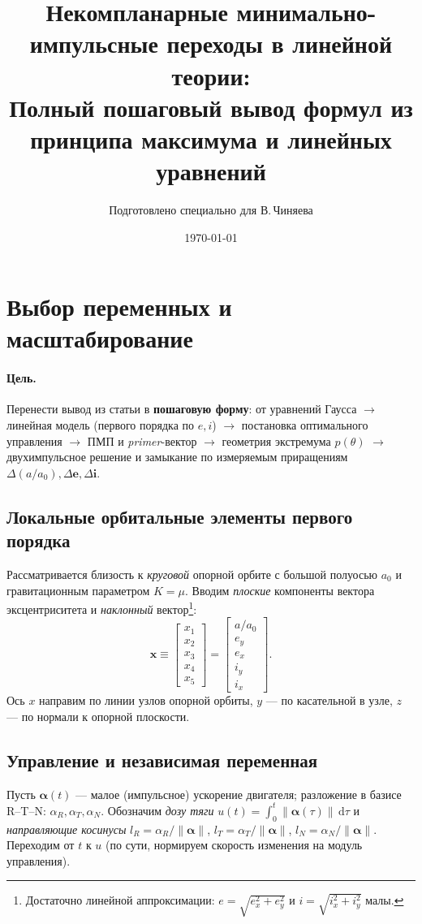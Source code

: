 \documentclass[12pt,a4paper]{article}
\title{Некомпланарные минимально-импульсные переходы в линейной теории:\\
\large Полный пошаговый вывод формул из принципа максимума и линейных уравнений}
\author{Подготовлено специально для В.\,Чиняева}
\date{\today}
\newcommand{\dd}{\,\mathrm{d}}
\newcommand{\vv}[1]{\bm{#1}}
\begin{document}
\maketitle
\tableofcontents

\section{Выбор переменных и масштабирование}

\paragraph{Цель.}
Перенести вывод из статьи в \textbf{пошаговую форму}: от уравнений Гаусса $\to$ линейная модель (первого порядка по $e,i$) $\to$ постановка оптимального управления $\to$ ПМП и \emph{primer}-вектор $\to$ геометрия экстремума $p(\theta)$ $\to$ двухимпульсное решение и замыкание по измеряемым приращениям $\Delta(a/a_0),\Delta\vv e,\Delta\vv i$.

\subsection{Локальные орбитальные элементы первого порядка}
Рассматривается близость к \emph{круговой} опорной орбите с большой полуосью $a_0$ и гравитационным параметром $K=\mu$.
Вводим \emph{плоские} компоненты вектора эксцентриситета и \emph{наклонный} вектор\footnote{Достаточно линейной аппроксимации: $e=\sqrt{e_x^2+e_y^2}$ и $i=\sqrt{i_x^2+i_y^2}$ малы.}:
\begin{equation}
\vv x \equiv
\begin{bmatrix}
x_1\\x_2\\x_3\\x_4\\x_5
\end{bmatrix}
=
\begin{bmatrix}
a/a_0\\ e_y\\ e_x\\ i_y\\ i_x
\end{bmatrix}.
\end{equation}
Ось $x$ направим по линии узлов опорной орбиты, $y$ --- по касательной в узле, $z$ --- по нормали к опорной плоскости.

\subsection{Управление и независимая переменная}
Пусть $\vv \alpha(t)$ --- малое (импульсное) ускорение двигателя; разложение в базисе R--T--N:
\(
\alpha_R,\alpha_T,\alpha_N
\).
Обозначим \emph{дозу тяги} $u(t)=\int_0^t \|\vv\alpha(\tau)\|\dd\tau$ и \emph{направляющие косинусы} $l_R=\alpha_R/\|\vv\alpha\|$, $l_T=\alpha_T/\|\vv\alpha\|$, $l_N=\alpha_N/\|\vv\alpha\|$.
Переходим от $t$ к $u$ (по сути, нормируем скорость изменения на модуль управления).
\end{document}
